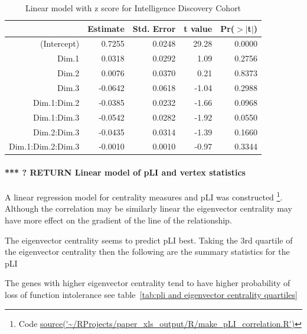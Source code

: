 \begin{table}[ht]
\centering
\begin{tabular}{rrrrr}
  \hline
 & Estimate & Std. Error & t value & Pr($>$$|$t$|$) \\ 
  \hline
(Intercept) & 0.7255 & 0.0248 & 29.28 & 0.0000 \\ 
  Dim.1 & 0.0318 & 0.0292 & 1.09 & 0.2756 \\ 
  Dim.2 & 0.0076 & 0.0370 & 0.21 & 0.8373 \\ 
  Dim.3 & -0.0642 & 0.0618 & -1.04 & 0.2988 \\ 
  Dim.1:Dim.2 & -0.0385 & 0.0232 & -1.66 & 0.0968 \\ 
  Dim.1:Dim.3 & -0.0542 & 0.0282 & -1.92 & 0.0550 \\ 
  Dim.2:Dim.3 & -0.0435 & 0.0314 & -1.39 & 0.1660 \\ 
  Dim.1:Dim.2:Dim.3 & -0.0010 & 0.0010 & -0.97 & 0.3344 \\ 
   \hline
\end{tabular}
\caption{Linear model with z score for Intelligence Discovery Cohort}
\end{table}




\paragraph{*** ? RETURN Linear model of pLI and vertex statistics}    
A linear regression model for centrality measures and pLI was constructed \footnote{Code \url{source('~/RProjects/paper_xls_output/R/make_pLI_correlation.R')}}. Although the correlation may be similarly linear the eigenvector centrality may have more effect on the gradient of the line of the relationship. 

The eigenvector centrality seems to predict pLI best. Taking the 3rd quartile of the eigenvector centrality then the following are the summary statistics for the pLI

The genes with higher eigenvector centrality tend to have higher probability of loss of function intolerance see table~\ref{tab:pli and eigenvector centrality quartiles}

